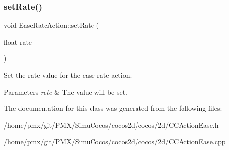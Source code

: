 \subsubsection{\texorpdfstring{set\+Rate()}{setRate()}\hspace{0.1cm}{\footnotesize\ttfamily [2/2]}}
{\footnotesize\ttfamily void Ease\+Rate\+Action\+::set\+Rate (\begin{DoxyParamCaption}\item[{float}]{rate }\end{DoxyParamCaption})\hspace{0.3cm}{\ttfamily [inline]}}



Set the rate value for the ease rate action. 


\begin{DoxyParams}{Parameters}
{\em rate} & The value will be set. \\
\hline
\end{DoxyParams}


The documentation for this class was generated from the following files\+:\begin{DoxyCompactItemize}
\item 
/home/pmx/git/\+P\+M\+X/\+Simu\+Cocos/cocos2d/cocos/2d/C\+C\+Action\+Ease.\+h\item 
/home/pmx/git/\+P\+M\+X/\+Simu\+Cocos/cocos2d/cocos/2d/C\+C\+Action\+Ease.\+cpp\end{DoxyCompactItemize}
